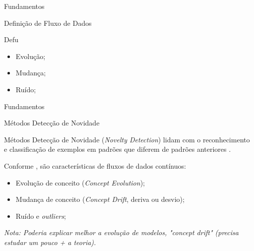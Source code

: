 \documentclass[aspectratio=43,10pt]{beamer}
\newcommand{\nota}[1]{\hspace*{-0.5cm}\textit{{\color[rgb]{1,0,0}Nota: #1}}}
\begin{document}
\begin{frame}[fragile]{Fundamentos}


\begin{block}{Definição de Fluxo de Dados}
  
  \vspace{5mm}
  Defu

  \begin{itemize}
    \item Evolução;
    \item Mudança;
    \item Ruído;
  \end{itemize}
\end{block}
\end{frame}

\newcommand{\novelty}{\emph{Novelty Detection}\xspace}
\newcommand{\nd}{ND\xspace}
\newcommand{\drift}{\emph{Concept Drift}\xspace}
\newcommand{\evolution}{\emph{Concept Evolution}\xspace}

\begin{frame}[fragile]{Fundamentos}
  \begin{alertblock}{Métodos Detecção de Novidade}
    
    \vspace{5mm}
    Métodos Detecção de Novidade (\novelty) lidam com o reconhecimento e
    classificação de exemplos em padrões que diferem de padrões anteriores
    \cite{PERNER2007,Gama2010}.
  
    Conforme , são características de fluxos de dados contínuos:
    \begin{itemize}
      \item Evolução de conceito (\evolution);
      \item Mudança de conceito (\drift, deriva ou desvio);
      \item Ruído e \emph{outliers};
    \end{itemize}
  \end{alertblock}
\nota{Poderia explicar melhor a evolução de modelos, "concept drift"
(precisa estudar um pouco + a teoria).}
\end{frame}
\end{document}
